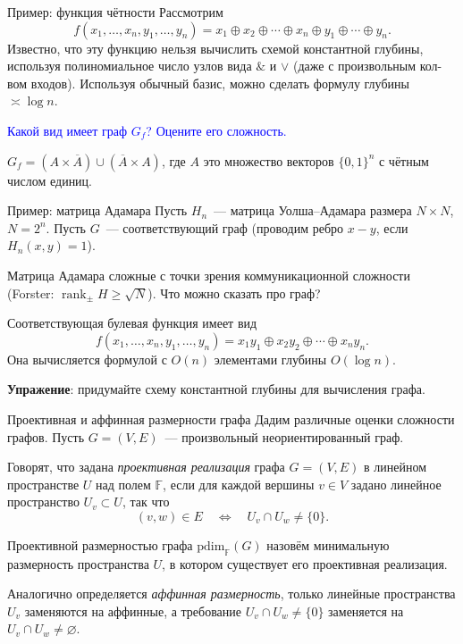 \documentclass{beamer}
\renewcommand\ge{\geqslant}
\DeclareMathOperator{\rank}{rank}
\begin{document}
\begin{frame}{Пример: функция чётности}
    Рассмотрим
    $$
    f(x_1,\ldots,x_n,y_1,\ldots,y_n)=x_1\oplus x_2\oplus\cdots\oplus
    x_n\oplus y_1\oplus\cdots\oplus y_n.
    $$
    Известно, что эту функцию нельзя вычислить схемой константной глубины,
    используя полиномиальное число узлов вида $\&$ и $\vee$ (даже с
    произвольным кол-вом входов). Используя обычный базис, можно сделать формулу
    глубины $\asymp\log n$.
    \pause\vspace{5pt}

    \textcolor{blue}{Какой вид имеет граф $G_f$? Оцените его
    сложность.}\pause
    
    $G_f=(A\times\overline{A})\cup(\overline{A}\times A)$, где
    $A$ это множество векторов $\{0,1\}^n$ с чётным числом единиц.

\end{frame}


\begin{frame}{Пример: матрица Адамара}
    Пусть $H_n$~--- матрица Уолша--Адамара размера $N\times N$, $N=2^n$. Пусть $G$~---
    соответствующий граф (проводим ребро $x-y$, если $H_n(x,y)=1$).
    \pause\vspace{5pt}
    
    Матрица Адамара сложные с точки зрения коммуникационной сложности (Forster:
    $\rank_\pm H\ge \sqrt{N}$). Что можно сказать про граф?
    \pause\vspace{5pt}

    Соответствующая булевая функция имеет вид
    $$
    f(x_1,\ldots,x_n,y_1,\ldots,y_n)=x_1y_1\oplus x_2y_2\oplus\cdots\oplus
    x_ny_n.
    $$
    Она вычисляется формулой с $O(n)$ элементами глубины $O(\log n)$. 
    \pause\vspace{5pt}

    \textbf{Упражение}: придумайте схему константной глубины для вычисления
    графа.


\end{frame}

\begin{frame}{Проективная и аффинная размерности графа}
    Дадим различные оценки сложности графов. Пусть
    $G=(V,E)$~--- произвольный неориентированный граф.
    \pause\vspace{5pt}

    Говорят, что задана \textit{проективная реализация} графа $G=(V,E)$ в линейном
    пространстве $U$ над полем $\mathbb F$, если для каждой вершины $v\in V$
    задано линейное пространство $U_v\subset U$, так что 
    $$
    (v,w)\in E\quad\Longleftrightarrow\quad U_v\cap U_w \ne \{0\}.
    $$
    \pause\vspace{5pt}

    Проективной размерностью графа $\mathrm{pdim}_{\mathbb F}(G)$ назовём минимальную
    размерность пространства $U$, в котором существует его проективная реализация.
    \pause\vspace{5pt}

    Аналогично определяется \textit{аффинная размерность}, только линейные
    пространства $U_v$ заменяются на аффинные, а требование $U_v\cap
    U_w\ne\{0\}$ заменяется на $U_v\cap U_w\ne\varnothing$.
\end{frame}
\end{document}
